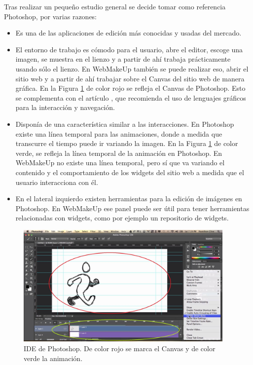 Tras realizar un pequeño estudio general se decide tomar como referencia Photoshop, por varias razones:
\begin{itemize}
\item{Es una de las aplicaciones de edición más conocidas y usadas del mercado.}
\item{El entorno de trabajo es cómodo para el usuario, abre el editor, escoge una imagen, se muestra en el lienzo y a partir de ahí trabaja prácticamente usando sólo el lienzo. En WebMakeUp también se puede realizar eso, abrir el sitio web y a partir de ahí trabajar sobre el Canvas del sitio web de manera gráfica. En la Figura \ref{fig:IDEPhotoshop} de color rojo se refleja el Canvas de Photoshop. Esto se complementa con el artículo \cite{WebSpec}, que recomienda el uso de lenguajes gráficos para la interacción y navegación.}
\item{Disponía de una característica similar a las interacciones. En Photoshop existe una línea temporal para las animaciones, donde a medida que transcurre el tiempo puede ir variando la imagen. En la Figura \ref{fig:IDEPhotoshop} de color verde, se refleja la línea temporal de la animación en Photoshop. En WebMakeUp no existe una línea temporal, pero sí que va variando el contenido y el comportamiento de los widgets del sitio web a medida que el usuario interacciona con él.}
\item{En el lateral izquierdo existen herramientas para la edición de imágenes en Photoshop. En WebMakeUp ese panel puede ser útil para tener herramientas relacionadas con widgets, como por ejemplo un repositorio de widgets.}
\end{itemize}

\begin{figure}
\begin{center}
\includegraphics[width=0.95\textwidth]{figs/4-PhotoshopAnimationIDE.png}
\caption{IDE de Photoshop. De color rojo se marca el Canvas y de color verde la animación.}
\label{fig:IDEPhotoshop}
\end{center}
\end{figure}

